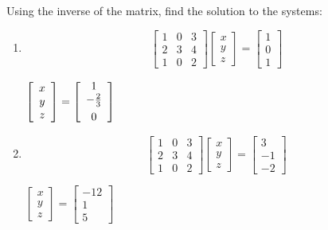 \documentclass{ximera}
\begin{document}
\begin{problem}\label{prb:4.45}Using the inverse of the matrix, find the solution to the systems:

\begin{enumerate}
\item
\begin{equation*}
\left[
\begin{array}{rrr}
1 & 0 & 3 \\
2 & 3 & 4 \\
1 & 0 & 2
\end{array}
\right] \left[
\begin{array}{c}
x \\
y \\
z
\end{array}
\right] =\left[
\begin{array}{r}
1 \\
0 \\
1
\end{array}
\right]
\end{equation*}
\begin{hint}
$\left[
\begin{array}{c}
x \\
y \\
z
\end{array}
\right] =\left[
\begin{array}{c}
1 \\
-\vspace{0.05in}\frac{2}{3} \\
0
\end{array}
\right]$
\end{hint}

\item
\begin{equation*}
\left[
\begin{array}{rrr}
1 & 0 & 3 \\
2 & 3 & 4 \\
1 & 0 & 2
\end{array}
\right] \left[
\begin{array}{c}
x \\
y \\
z
\end{array}
\right] =\left[
\begin{array}{r}
3 \\
-1 \\
-2
\end{array}
\right]
\end{equation*}

\begin{hint}
$\left[
\begin{array}{c}
x \\
y \\
z
\end{array}
\right] = \left[
\begin{array}{r}
-12 \\
1 \\
5
\end{array}
\right]$
\end{hint}
\end{enumerate}


\end{problem}
\end{document}
